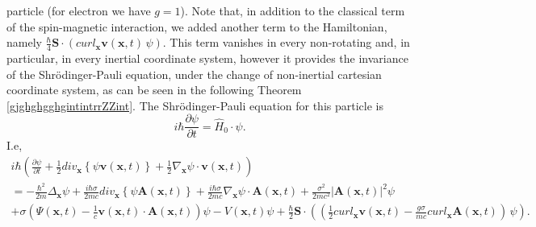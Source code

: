 \documentclass{article}
\theoremstyle{definition}
\theoremstyle{remark}
\renewcommand{\vec}[1]{\mathbf{#1}}
\begin{document}
particle (for electron we have $g=1$). Note that, in addition to the
classical term of the spin-magnetic interaction, we added another
term to the Hamiltonian, namely $\frac{\hbar}{4}\vec
S\cdot\left(curl_{\vec x}\vec v(\vec x,t)\,\psi\right)$. This term
vanishes in every non-rotating and, in particular, in every inertial
coordinate system, however it provides the invariance of the
Shr\"{o}dinger-Pauli equation, under the change of non-inertial
cartesian coordinate system, as can be seen in the following Theorem
\ref{gjghghgghgintintrrZZint}. The Shr\"{o}dinger-Pauli equation for
this particle is
\begin{equation}\label{vhfffngghkjgghfjjghghghhjghjgghkghggkghghjghSYSPNnnkkllkkkZZint}
i\hbar\frac{\partial\psi}{\partial t}=\hat H_0\cdot\psi.
\end{equation}
I.e,
\begin{multline}\label{vhfffngghkjgghfjjghghghSYShmyuuiiuuhmhmiopoopnniukjhjkk;l;lkhjjkihjjhkkkkkjjjZZint}
i\hbar\left(\frac{\partial\psi}{\partial t}+\frac{1}{2}div_{\vec
x}\left\{\psi\vec v(\vec x,t)\right\}+\frac{1}{2}\nabla_{\vec
x}\psi\cdot\vec v(\vec x,t)\right)\\=-\frac{\hbar^2}{2m}\Delta_{\vec
x}\psi+\frac{i\hbar\sigma}{2mc}div_{\vec x}\left\{\psi\vec A(\vec
x,t)\right\}+\frac{i\hbar\sigma}{2mc}\nabla_{\vec x}\psi\cdot\vec
A(\vec x,t)+\frac{\sigma^2}{2mc^2}\left|\vec A(\vec
x,t)\right|^2\psi\\
%
%
%
+\sigma\left(\Psi(\vec x,t)-\frac{1}{c}\vec v(\vec x,t)\cdot\vec
A(\vec x,t)\right)\psi-V\left(\vec
x,t\right)\psi+\frac{\hbar}{2}\vec
S\cdot\left(\left(\frac{1}{2}curl_{\vec x}\vec v(\vec
x,t)-\frac{g\sigma}{mc}curl_{\vec x}\vec A(\vec
x,t)\right)\,\psi\right).
\end{multline}
\end{document}
